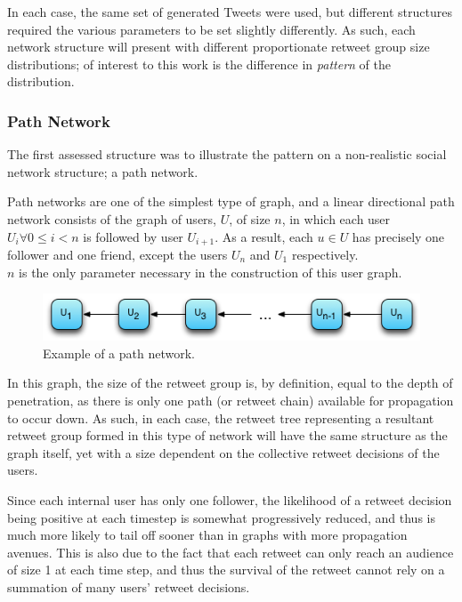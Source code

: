 In each case, the same set of generated Tweets were used, but different structures required the various parameters to be set slightly differently. As such, each network structure will present with different proportionate retweet group size distributions; of interest to this work is the difference in \textit{pattern} of the distribution.


\subsubsection{Path Network}
The first assessed structure was to illustrate the pattern on a non-realistic social network structure; a path network.

Path networks are one of the simplest type of graph, and a linear directional path network consists of the graph of users, $U$, of size $n$, in which each user $U_i \forall 0 \leq i < n$ is followed by user $U_{i+1}$. As a result, each $u \in U$ has precisely one follower and one friend, except the users $U_n$ and $U_1$ respectively.\\
$n$ is the only parameter necessary in the construction of this user graph.

\begin{figure}[h]
\centering
\includegraphics[scale=0.8]{4.Chapter2/Media/path_network.png} 
\caption{Example of a path network.}
\label{fig:path_network}
\end{figure}

In this graph, the size of the retweet group is, by definition, equal to the depth of penetration, as there is only one path (or retweet chain) available for propagation to occur down. As such, in each case, the retweet tree representing a resultant retweet group formed in this type of network will have the same structure as the graph itself, yet with a size dependent on the collective retweet decisions of the users.

Since each internal user has only one follower, the likelihood of a retweet decision being positive at each timestep is somewhat progressively reduced, and thus is much more likely to tail off sooner than in graphs with more propagation avenues. This is also due to the fact that each retweet can only reach an audience of size 1 at each time step, and thus the survival of the retweet cannot rely on a summation of many users' retweet decisions. 

